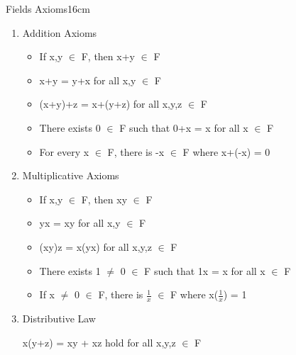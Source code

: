 	\begin{definition}{Fields Axioms}{16cm}
		\begin{enumerate}[label=(\alph*), leftmargin=0.5cm, itemsep=0.1cm]
			\item Addition Axioms
			
				\begin{itemize}[leftmargin=0.5cm, itemsep=0.1cm]
					\item If x,y $\in$ F, then x+y $\in$ F
				
					\item x+y = y+x for all x,y $\in$ F
				
					\item (x+y)+z = x+(y+z) for all x,y,z $\in$ F
				
					\item There exists 0 $\in$ F such that 0+x = x for all x $\in$ F
				
					\item For every x $\in$ F, there is -x $\in$ F where x+(-x) = 0
				\end{itemize}

			\item Multiplicative Axioms
			
				\begin{itemize}[leftmargin=0.5cm, itemsep=0.1cm]
					\item If x,y $\in$ F, then xy $\in$ F
				
					\item yx = xy for all x,y $\in$ F
				
					\item (xy)z = x(yx) for all x,y,z $\in$ F
				
					\item There exists 1 $\not =$ 0 $\in$ F such that
						1x = x for all x $\in$ F
				
					\item If x $\not =$ 0 $\in$ F, there is $\frac{1}{x}$ $\in$ F
						where x($\frac{1}{x}$) = 1
				\end{itemize}

			\item Distributive Law
			
				\hspace{0.5cm}
				x(y+z) = xy + xz hold for all x,y,z $\in$ F
		\end{enumerate}
	\end{definition}

	\vspace{0.5cm}



